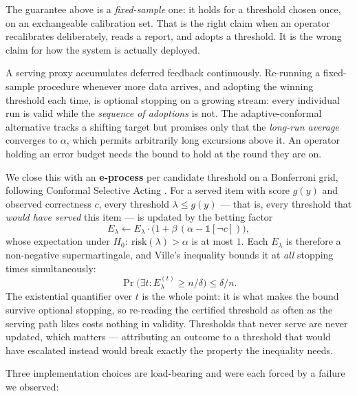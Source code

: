 \documentclass[11pt]{article}
\begin{document}
The guarantee above is a \emph{fixed-sample} one: it holds for a threshold chosen once, on an
exchangeable calibration set. That is the right claim when an operator recalibrates deliberately,
reads a report, and adopts a threshold. It is the wrong claim for how the system is actually
deployed.

A serving proxy accumulates deferred feedback continuously. Re-running a fixed-sample procedure
whenever more data arrives, and adopting the winning threshold each time, is optional stopping on a
growing stream: every individual run is valid while the \emph{sequence of adoptions} is not. The
adaptive-conformal alternative \cite{gibbs2021adaptive} tracks a shifting target but promises only
that the \emph{long-run average} converges to $\alpha$, which permits arbitrarily long excursions
above it. An operator holding an error budget needs the bound to hold at the round they are on.

We close this with an \textbf{e-process} per candidate threshold on a Bonferroni grid, following
Conformal Selective Acting \cite{khosravi2026csa}. For a served item with score $g(y)$ and observed
correctness $c$, every threshold $\lambda \leq g(y)$ --- that is, every threshold that \emph{would
have served} this item --- is updated by the betting factor
\[
E_\lambda \leftarrow E_\lambda \cdot \bigl(1 + \beta\,(\alpha - \mathbb{1}[\neg c])\bigr),
\]
whose expectation under $H_0\!:\ \mathrm{risk}(\lambda) > \alpha$ is at most $1$. Each $E_\lambda$ is
therefore a non-negative supermartingale, and Ville's inequality bounds it at \emph{all} stopping
times simultaneously:
\[
\Pr\bigl(\exists t : E_\lambda^{(t)} \geq n/\delta\bigr) \leq \delta/n .
\]
The existential quantifier over $t$ is the whole point: it is what makes the bound survive optional
stopping, so re-reading the certified threshold as often as the serving path likes costs nothing in
validity. Thresholds that never serve are never updated, which matters --- attributing an outcome to
a threshold that would have escalated instead would break exactly the property the inequality needs.

Three implementation choices are load-bearing and were each forced by a failure we observed:
\end{document}

